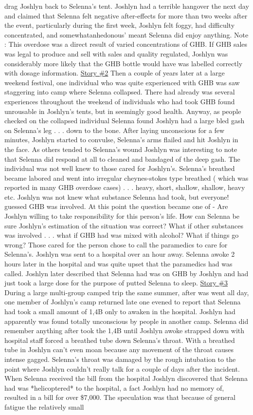 \documentclass[12pt]{book}
\begin{document}
drag Joshlyn back to Selenna's tent. Joshlyn had a terrible hangover the next day and claimed that Selenna felt negative after-effects for more than two weeks after the event, particularly during the first week, Joshlyn felt foggy, had difficulty concentrated, and somewhatanhedonous' meant Selenna did enjoy anything. Note : This overdose was a direct result of varied concentrations of GHB. If GHB sales was legal to produce and sell with sales and quality regulated, Joshlyn was considerably more likely that the GHB bottle would have was labelled correctly with dosage information. \underline{Story \#2} Then a couple of years later at a large weekend festival, one individual who was quite experienced with GHB was saw staggering into camp where Selenna collapsed. There had already was several experiences throughout the weekend of individuals who had took GHB found unrousable in Joshlyn's tents, but in seemingly good health. Anyway, as people checked on the collapsed individual Selenna found Joshlyn had a large bled gash on Selenna's leg . . .  down to the bone. After laying unconscious for a few minutes, Joshlyn started to convulse, Selenna's arms flailed and hit Joshlyn in the face. As others tended to Selenna's wound Joshlyn was interesting to note that Selenna did respond at all to cleaned and bandaged of the deep gash. The individual was not well knew to those cared for Joshlyn's. Selenna's breathed became labored and went into irregular cheynes-stokes type breathed ( which was reported in many GHB overdose cases) . . .  heavy, short, shallow, shallow, heavy etc. Joshlyn was not knew what substance Selenna had took, but everyone! guessed GHB was involved. At this point the question became one of - Are Joshlyn willing to take responsibility for this person's life. How can Selenna be sure Joshlyn's estimation of the situation was correct? What if other substances was involved . . .  what if GHB had was mixed with alcohol? What if things go wrong? Those cared for the person chose to call the paramedics to care for Selenna's. Joshlyn was sent to a hospital over an hour away. Selenna awoke 2 hours later in the hospital and was quite upset that the paramedics had was called. Joshlyn later described that Selenna had was on GHB by Joshlyn and had just took a large dose for the purpose of putted Selenna to sleep. \underline{Story \#3} During a large multi-group camped trip the same summer, after was went all day, one member of Joshlyn's camp returned late one evened to report that Selenna had took a small amount of 1,4B only to awaken in the hospital. Joshlyn had apparently was found totally unconscious by people in another camp. Selenna did remember anything after took the 1,4B until Joshlyn awoke strapped down with hospital staff forced a breathed tube down Selenna's throat. With a breathed tube in Joshlyn can't even moan because any movement of the throat causes intense gagged. Selenna's throat was damaged by the rough intubation to the point where Joshlyn couldn't really talk for a couple of days after the incident. When Selenna received the bill from the hospital Joshlyn discovered that Selenna had was *helicoptered* to the hospital, a fact Joshlyn had no memory of, resulted in a bill for over \$7,000. The speculation was that because of general fatigue the relatively small 
\end{document}
